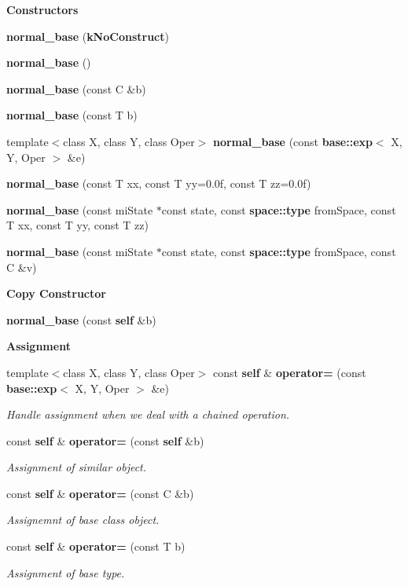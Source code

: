 \begin{Indent}{\bf Constructors}\par
\begin{CompactItemize}
\item 
{\bf normal\_\-base} ({\bf k\-No\-Construct})
\item 
{\bf normal\_\-base} ()
\item 
{\bf normal\_\-base} (const C \&b)
\item 
{\bf normal\_\-base} (const T b)
\item 
template$<$class X, class Y, class Oper$>$ {\bf normal\_\-base} (const {\bf base::exp}$<$ X, Y, Oper $>$ \&e)
\item 
{\bf normal\_\-base} (const T xx, const T yy=0.0f, const T zz=0.0f)
\item 
{\bf normal\_\-base} (const mi\-State $\ast$const state, const {\bf space::type} from\-Space, const T xx, const T yy, const T zz)
\item 
{\bf normal\_\-base} (const mi\-State $\ast$const state, const {\bf space::type} from\-Space, const C \&v)
\end{CompactItemize}
\end{Indent}
\begin{Indent}{\bf Copy Constructor}\par
\begin{CompactItemize}
\item 
{\bf normal\_\-base} (const {\bf self} \&b)
\end{CompactItemize}
\end{Indent}
\begin{Indent}{\bf Assignment}\par
\begin{CompactItemize}
\item 
template$<$class X, class Y, class Oper$>$ const {\bf self} \& {\bf operator=} (const {\bf base::exp}$<$ X, Y, Oper $>$ \&e)
\begin{CompactList}\small\item\em Handle assignment when we deal with a chained operation. \item\end{CompactList}\item 
const {\bf self} \& {\bf operator=} (const {\bf self} \&b)
\begin{CompactList}\small\item\em Assignment of similar object. \item\end{CompactList}\item 
const {\bf self} \& {\bf operator=} (const C \&b)
\begin{CompactList}\small\item\em Assignemnt of base class object. \item\end{CompactList}\item 
const {\bf self} \& {\bf operator=} (const T b)
\begin{CompactList}\small\item\em Assignment of base type. \item\end{CompactList}\end{CompactItemize}
\end{Indent}
